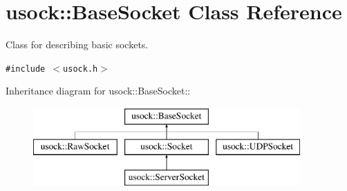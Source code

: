\hypertarget{classusock_1_1BaseSocket}{
\section{usock::BaseSocket Class Reference}
\label{classusock_1_1BaseSocket}
}
Class for describing basic sockets.  


{\tt \#include $<$usock.h$>$}

Inheritance diagram for usock::BaseSocket::\begin{figure}[H]
\begin{center}
\leavevmode
\includegraphics[height=3cm]{classusock_1_1BaseSocket}
\end{center}
\end{figure}
